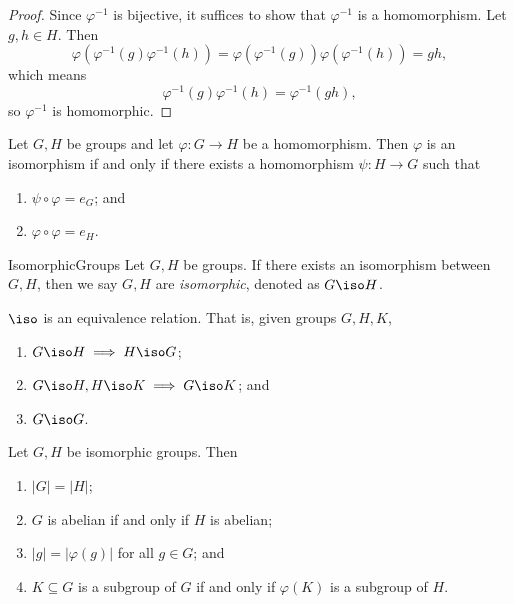 \documentclass[pmath347]{subfiles}
\begin{document}
    \begin{proof}
        Since $\varphi^{-1} $ is bijective, it suffices to show that $\varphi^{-1} $ is a homomorphism. Let $g,h\in H$. Then
        \begin{equation*}
            \varphi\left( \varphi^{-1} \left( g \right) \varphi^{-1} \left( h \right)  \right) = \varphi\left( \varphi^{-1} \left( g \right)  \right) \varphi\left( \varphi^{-1} \left( h \right)  \right) = gh,
        \end{equation*}
        which means
        \begin{equation*}
            \varphi^{-1} \left( g \right) \varphi^{-1} \left( h \right) = \varphi^{-1} \left( gh \right) ,
        \end{equation*}
        so $\varphi^{-1} $ is homomorphic.
    \end{proof}

    \clearpage
    \begin{cor}{}
        Let $G,H$ be groups and let $\varphi:G\to H$ be a homomorphism. Then $\varphi$ is an isomorphism if and only if there exists a homomorphism $\psi:H\to G$ such that
        \begin{enumerate}
            \item $\psi\circ\varphi = e_G$; and
            \item $\varphi\circ\varphi = e_H$.
        \end{enumerate}
    \end{cor}	

    \begin{definition}{Isomorphic}{Groups}
        Let $G,H$ be groups. If there exists an isomorphism between $G,H$, then we say $G,H$ are \emph{isomorphic}, denoted as $G\iso H$.
    \end{definition}

    \np $\iso$ is an equivalence relation. That is, given groups $G,H,K$,
    \begin{enumerate}
        \item $G\iso H\implies H\iso G$;
        \item $G\iso H, H\iso K\implies G\iso K$; and
        \item $G\iso G$.
    \end{enumerate}

    \begin{prop}{}
        Let $G,H$ be isomorphic groups. Then
        \begin{enumerate}
            \item $\left| G \right| = \left| H \right| $;
            \item $G$ is abelian if and only if $H$ is abelian;
            \item $\left| g \right| = \left| \varphi\left( g \right)  \right| $ for all $g\in G$; and
            \item $K\subseteq G$ is a subgroup of $G$ if and only if $\varphi\left( K \right) $ is a subgroup of $H$.
        \end{enumerate}
    \end{prop}
\end{document}
